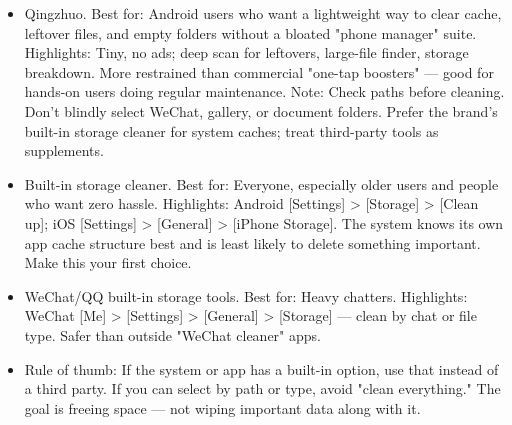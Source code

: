 \begin{itemize}
  \item Qingzhuo. Best for: Android users who want a lightweight way to clear cache, leftover files, and empty folders without a bloated "phone manager" suite. Highlights: Tiny, no ads; deep scan for leftovers, large-file finder, storage breakdown. More restrained than commercial "one-tap boosters" — good for hands-on users doing regular maintenance. Note: Check paths before cleaning. Don't blindly select WeChat, gallery, or document folders. Prefer the brand's built-in storage cleaner for system caches; treat third-party tools as supplements.
  \item Built-in storage cleaner. Best for: Everyone, especially older users and people who want zero hassle. Highlights: Android [Settings] > [Storage] > [Clean up]; iOS [Settings] > [General] > [iPhone Storage]. The system knows its own app cache structure best and is least likely to delete something important. Make this your first choice.
  \item WeChat/QQ built-in storage tools. Best for: Heavy chatters. Highlights: WeChat [Me] > [Settings] > [General] > [Storage] — clean by chat or file type. Safer than outside "WeChat cleaner" apps.
  \item Rule of thumb: If the system or app has a built-in option, use that instead of a third party. If you can select by path or type, avoid "clean everything." The goal is freeing space — not wiping important data along with it.
\end{itemize}


